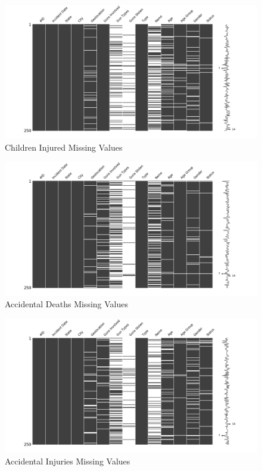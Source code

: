 \documentclass[12pt, a4paper]{article}
\begin{document}
\begin{figure}[H]
\includegraphics[width=\textwidth]{missing_children_injured.png}
\caption{Children Injured Missing Values}
\end{figure}

\begin{figure}[H]
\includegraphics[width=\textwidth]{missing_accidental_deaths.png}
\caption{Accidental Deaths Missing Values}
\end{figure}

\begin{figure}[H]
\includegraphics[width=\textwidth]{missing_accidental_injuries.png}
\caption{Accidental Injuries Missing Values}
\end{figure}
\end{document}
